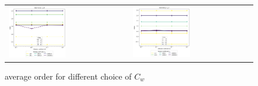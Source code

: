 \begin{figure}[h!]
	\centering
	\begin{tabular}{p{} p{}}
		\vspace{0pt} 
		
\includegraphics[width=0.49\textwidth]{../figs/parametric/diffusion_2D/ord_laplace_2_4}
		&
		\vspace{0pt} 
		
\includegraphics[width=0.49\textwidth]{../figs/parametric/diffusion_2D/ord_laplace_2_3}
	\end{tabular}
	\caption{ average order for different choice of $C_w$}
	\label{fig:orders_lapalce}
\end{figure}

%		
%		

